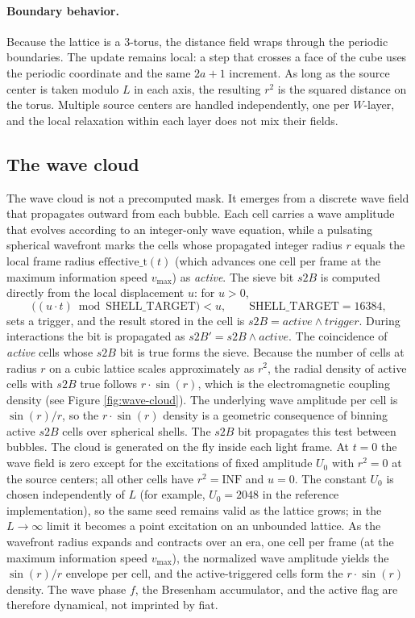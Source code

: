 \documentclass{ijuc}
\begin{document}
\paragraph{Boundary behavior.}
Because the lattice is a 3-torus, the distance field wraps through the periodic boundaries.  The update remains local: a step that crosses a face of the cube uses the periodic coordinate and the same $2a+1$ increment.  As long as the source center is taken modulo $L$ in each axis, the resulting $r^{2}$ is the squared distance on the torus.  Multiple source centers are handled independently, one per $W$-layer, and the local relaxation within each layer does not mix their fields.
\subsection{The wave cloud}\label{subsec:Sine}
The wave cloud is not a precomputed mask. It emerges from a discrete wave field that propagates outward from each bubble. Each cell carries a wave amplitude that evolves according to an integer-only wave equation, while a pulsating spherical wavefront marks the cells whose propagated integer radius $r$ equals the local frame radius $\mathrm{effective\_t}(t)$ (which advances one cell per frame at the maximum information speed $v_{\max}$) as \emph{active}. The sieve bit $s2B$ is computed directly from the local displacement $u$: for $u>0$,
\[
\bigl((u \cdot t) \bmod \mathrm{SHELL\_TARGET}\bigr) < u,
\qquad \mathrm{SHELL\_TARGET}=16384,
\]
sets a trigger, and the result stored in the cell is $s2B = \mathit{active} \land \mathit{trigger}$. During interactions the bit is propagated as $s2B' = s2B \land \mathit{active}$. The coincidence of \emph{active} cells whose $s2B$ bit is true forms the sieve.
Because the number of cells at radius $r$ on a cubic lattice scales approximately as $r^{2}$, the radial density of active cells with $s2B$ true follows $r\cdot\sin(r)$, which is the electromagnetic coupling density (see Figure \ref{fig:wave-cloud}). The underlying wave amplitude per cell is $\sin(r)/r$, so the $r\cdot\sin(r)$ density is a geometric consequence of binning active $s2B$ cells over spherical shells. The $s2B$ bit propagates this test between bubbles.
The cloud is generated on the fly inside each light frame.  At $t=0$ the wave field is zero except for the excitations of fixed amplitude $U_{0}$ with $r^{2}=0$ at the source centers; all other cells have $r^{2}=\mathrm{INF}$ and $u=0$.  The constant $U_{0}$ is chosen independently of $L$ (for example, $U_{0}=2048$ in the reference implementation), so the same seed remains valid as the lattice grows; in the $L\to\infty$ limit it becomes a point excitation on an unbounded lattice.  As the wavefront radius expands and contracts over an era, one cell per frame (at the maximum information speed $v_{\max}$), the normalized wave amplitude yields the $\sin(r)/r$ envelope per cell, and the active-triggered cells form the $r\cdot\sin(r)$ density.  The wave phase $f$, the Bresenham accumulator, and the active flag are therefore dynamical, not imprinted by fiat.
\end{document}
